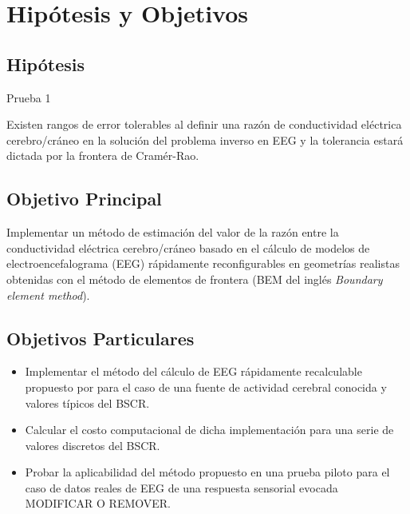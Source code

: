 %
\chapter{Hipótesis y Objetivos}
\label{sec:obj}

\section{Hipótesis}
\label{sec:obj:hipotesis}

Prueba 1

Existen rangos de error tolerables al definir una razón de conductividad eléctrica cerebro/cráneo en la solución del problema inverso en EEG y la tolerancia estará dictada por la frontera de Cramér-Rao.

\section{Objetivo Principal}
\label{sec:obj:main}


Implementar un método de estimación del valor de la razón entre la conductividad eléctrica cerebro/cráneo basado en el cálculo de modelos de electroencefalograma (EEG) rápidamente reconfigurables en geometrías realistas obtenidas con el método de elementos de frontera (BEM del inglés \emph{Boundary element method}).

\section{Objetivos Particulares}
\label{sec:obj:individual}

\begin{itemize}
	\item Implementar el método del cálculo de EEG rápidamente recalculable propuesto por \citeauthor{Ermer2001}\cite{Ermer2001} para el caso de una fuente de actividad cerebral conocida y valores típicos del BSCR.
	\item Calcular el costo computacional de dicha implementación para una serie de valores discretos del BSCR.
	\item Probar la aplicabilidad del método propuesto en una prueba piloto para el caso de datos reales de EEG de una respuesta sensorial evocada MODIFICAR O REMOVER.
\end{itemize}